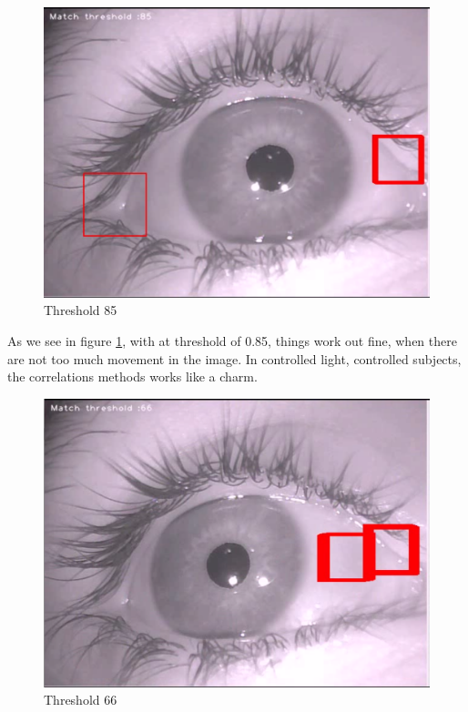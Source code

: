 \begin{figure}[htbp]
\centering
\includegraphics{pics/template_matching/1.png}
\caption{Threshold 85 \label{tm1}}
\end{figure}

As we see in figure \ref{tm1}, with at threshold of 0.85, things work
out fine, when there are not too much movement in the image. In
controlled light, controlled subjects, the correlations methods works
like a charm.

\begin{figure}[htbp]
\centering
\includegraphics{pics/template_matching/2.png}
\caption{Threshold 66 \label{tm2}}
\end{figure}

